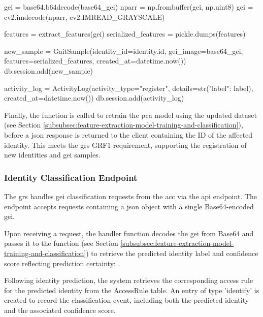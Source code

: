 \begin{code}
gei = base64.b64decode(base64_gei)
nparr = np.frombuffer(gei, np.uint8)
gei = cv2.imdecode(nparr, cv2.IMREAD_GRAYSCALE)

features = extract_features(gei)
serialized_features = pickle.dumps(features)

new_sample = GaitSample(identity_id=identity.id, gei_image=base64_gei, features=serialized_features, created_at=datetime.now())
db.session.add(new_sample)

activity_log = ActivityLog(activity_type="register", details=str({"label": label}), created_at=datetime.now())
db.session.add(activity_log)
\end{code}
\label{lst:identity-registration} \vspace{10pt}

Finally, the  function is called to retrain the \ac{pca} model using the updated dataset (see Section \ref{subsubsec:feature-extraction-model-training-and-classification}), before a \ac{json} response is returned to the client containing the ID of the affected identity.
This meets the \ac{grs} GRF1 requirement, supporting the registration of new identities and \ac{gei} samples.

\subsubsection{Identity Classification Endpoint}
\label{subsec:identity-classification-endpoint}

The \ac{grs} handles \ac{gei} classification requests from the \ac{acc} via the  \ac{api} endpoint.
The endpoint accepts  requests containing a \ac{json} object with a single Base64-encoded \ac{gei}.

Upon receiving a request, the handler function decodes the \ac{gei} from Base64 and passes it to the  function (see Section \ref{subsubsec:feature-extraction-model-training-and-classification}) to retrieve the predicted identity label and confidence score reflecting prediction certainty: .

Following identity prediction, the system retrieves the corresponding access rule for the predicted identity from the AccessRule table.
An  entry of type 'identify' is created to record the classification event, including both the predicted identity and the associated confidence score.

